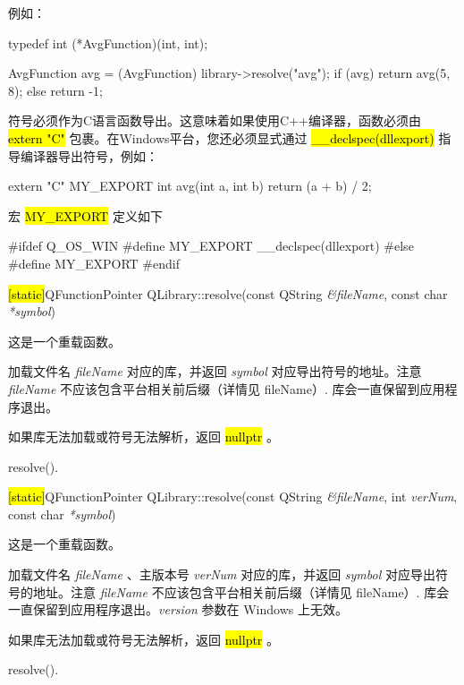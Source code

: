 例如：

\begin{cppcode}
typedef int (*AvgFunction)(int, int);

AvgFunction avg = (AvgFunction) library->resolve("avg");
if (avg)
    return avg(5, 8);
else
    return -1;
\end{cppcode}

符号必须作为C语言函数导出。这意味着如果使用C++编译器，函数必须由
\hl{extern "C"} 包裹。在Windows平台，您还必须显式通过 \hl{\_\_declspec(dllexport)}
指导编译器导出符号，例如：

\begin{cppcode}
extern "C" MY_EXPORT int avg(int a, int b)
{
    return (a + b) / 2;
}
\end{cppcode}

宏 \hl{MY\_EXPORT} 定义如下

\begin{cppcode}
#ifdef Q_OS_WIN
#define MY_EXPORT __declspec(dllexport)
#else
#define MY_EXPORT
#endif
\end{cppcode}




\hl{[static]}QFunctionPointer QLibrary::resolve(const QString \emph{\&fileName}, const char \emph{*symbol})

这是一个重载函数。

加载文件名 \emph{fileName} 对应的库，并返回 \emph{symbol} 对应导出符号的地址。注意 \emph{fileName} 不应该包含平台相关前后缀（详情见 fileName）. 库会一直保留到应用程序退出。

如果库无法加载或符号无法解析，返回 \hl{nullptr} 。

\begin{seeAlso}
resolve().
\end{seeAlso}

\hl{[static]}QFunctionPointer QLibrary::resolve(const QString
\emph{\&fileName}, int \emph{verNum}, const char \emph{*symbol})

这是一个重载函数。

加载文件名 \emph{fileName} 、主版本号 \emph{verNum} 对应的库，并返回 \emph{symbol} 对应导出符号的地址。注意 \emph{fileName} 不应该包含平台相关前后缀（详情见 fileName）. 库会一直保留到应用程序退出。\emph{version} 参数在 Windows 上无效。

如果库无法加载或符号无法解析，返回 \hl{nullptr} 。

\begin{seeAlso}
resolve().
\end{seeAlso}

